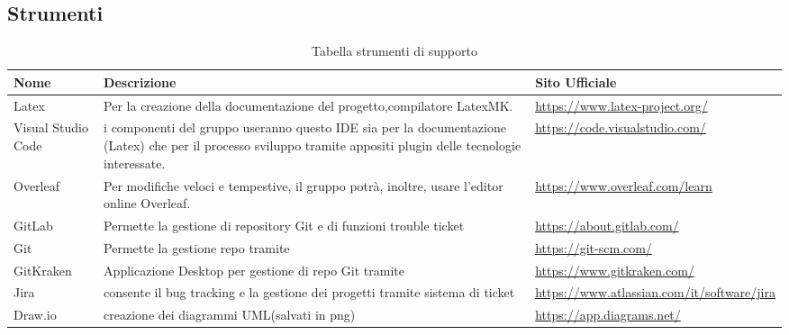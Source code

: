 \newpage
\subsection{Strumenti}
\hypertarget{ProcessiSupporto}{}
\begin{longtable}{ C{2cm} C{5.5cm} C{4cm}  }
    \caption{Tabella strumenti di supporto}\\
    \rowcolor{\primaryColor}
    \textcolor{\secondaryColor}{\textbf{Nome}} & \textcolor{\secondaryColor}{\textbf{Descrizione}} & \textcolor{\secondaryColor}{\textbf{Sito Ufficiale}}\\ \endhead
    {Latex} & {Per la creazione della documentazione del progetto,compilatore LatexMK.} & {\url{https://www.latex-project.org/}}\\
    {Visual Studio Code} & {i componenti del gruppo useranno questo IDE sia per la documentazione (Latex) che per il processo sviluppo tramite appositi plugin delle tecnologie interessate.} & {\url{https://code.visualstudio.com/}}\\
    {Overleaf} & {Per modifiche veloci e tempestive, il gruppo potrà, inoltre, usare l'editor online Overleaf.} & {\url{https://www.overleaf.com/learn}}\\
    {GitLab} & {Permette la gestione di repository Git e di funzioni trouble ticket } & {\url{https://about.gitlab.com/}}\\
    {Git}  & {Permette la gestione repo tramite  } & {\url{https://git-scm.com/}}\\
    {GitKraken}  & {Applicazione Desktop per gestione di repo Git tramite } & {\url{https://www.gitkraken.com/}}\\
    {Jira} & { consente il bug tracking e la gestione dei progetti  tramite sistema di ticket} & {\url{https://www.atlassian.com/it/software/jira}}\\
    {Draw.io} & { creazione dei diagrammi UML(salvati in png)} & {\url{https://app.diagrams.net/}}\\
\end{longtable} 

